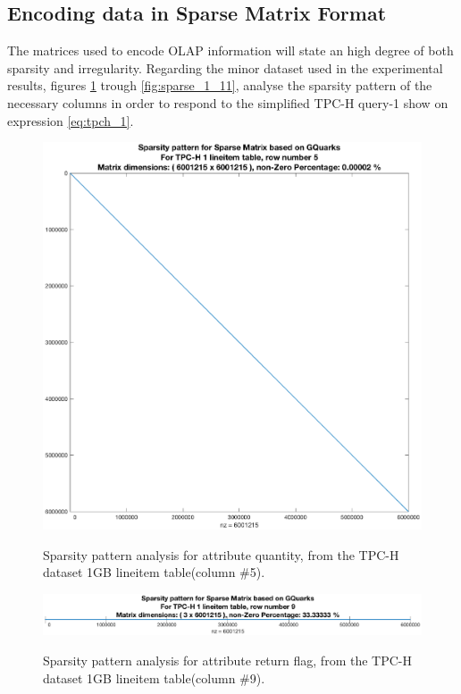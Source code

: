  

\subsection{Encoding data in Sparse Matrix Format}
\label{matrix_format}
The matrices used to encode OLAP information will state an high degree of both sparsity and irregularity. Regarding the minor dataset used in the experimental results, figures \ref{fig:sparse_1_5} trough \ref{fig:sparse_1_11}, analyse the sparsity pattern of the necessary columns in order to respond to the simplified TPC-H query-1 show on expression \ref{eq:tpch_1}.


\begin{figure}[H]
\centering
\caption{Sparsity pattern analysis for attribute quantity, from the TPC-H dataset 1GB lineitem table(column \#5).}
\includegraphics[width=1\columnwidth]{eps/sparsity_5.eps}
\label{fig:sparse_1_5}
\end{figure}

\begin{figure}[H]
\centering
\caption{Sparsity pattern analysis for attribute return flag, from the TPC-H dataset 1GB lineitem table(column \#9).}
\includegraphics[width=1\columnwidth]{eps/sparsity_9.eps}
\label{fig:sparse_1_9}
\end{figure}

